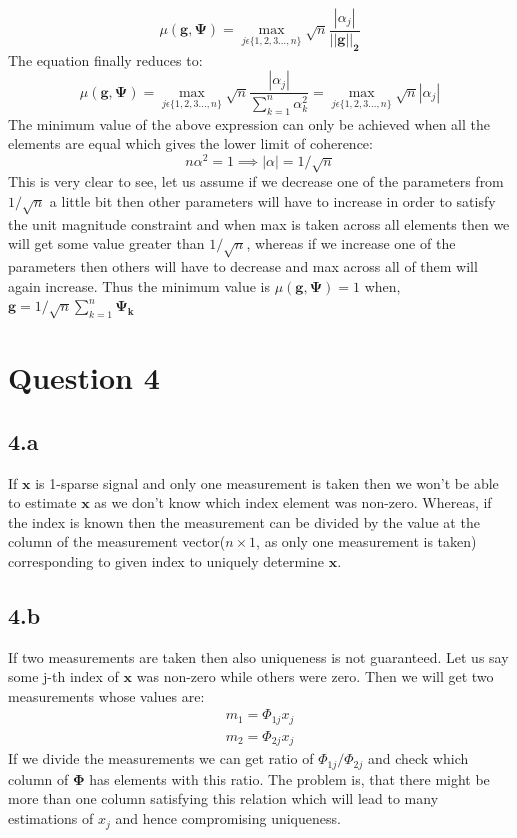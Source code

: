 \documentclass[12pt]{article}
\begin{document}
\begin{equation*}
    \mu(\boldsymbol{g}, \boldsymbol{\Psi}) =  \max_{j \epsilon \{1,2,3...,n\}}\sqrt{n}\frac{|\alpha_j|}{||\boldsymbol{g||_2}}
\end{equation*}
The equation finally reduces to:
\begin{equation*}
    \mu(\boldsymbol{g}, \boldsymbol{\Psi}) =  \max_{j \epsilon \{1,2,3...,n\}}\sqrt{n}\frac{|\alpha_j|}{\sum_{k=1}^{n}\alpha_k^2} = \max_{j \epsilon \{1,2,3...,n\}}\sqrt{n}|\alpha_j|
\end{equation*}
The minimum value of the above expression can only be achieved when all the elements are equal which gives the lower limit of coherence:
\begin{equation*}
    n\alpha^2 = 1 \implies |\alpha| = 1/\sqrt{n}
\end{equation*}
This is very clear to see, let us assume if we decrease one of the parameters from $1/\sqrt{n}$ a little bit then other parameters will have to increase in order to satisfy the unit magnitude constraint and when max is taken across all elements then we will get some value greater than $1/\sqrt{n}$, whereas if we increase one of the parameters then others will have to decrease and max across all of them will again increase. Thus the minimum value is $\mu(\boldsymbol{g}, \boldsymbol{\Psi}) = 1$ when, $\boldsymbol{g} = 1/\sqrt{n}\sum_{k=1}^{n}\boldsymbol{\Psi_k}$

\section*{Question 4}
\subsection*{4.a}
If $\boldsymbol{x}$ is 1-sparse signal and only one measurement is taken then we won't be able to estimate $\boldsymbol{x}$ as we don't know which index element was non-zero. Whereas, if the index is known then the measurement can be divided by the value at the column of the measurement vector($n\times1$, as only one measurement is taken) corresponding to given index to uniquely determine $\boldsymbol{x}$.
\subsection*{4.b}
If two measurements are taken then also uniqueness is not guaranteed. Let us say some j-th index of $\boldsymbol{x}$ was non-zero while others were zero. Then we will get two measurements whose values are:
\begin{align*}
    m_1 = \Phi_{1j}x_j\\
    m_2 = \Phi_{2j}x_j
\end{align*}
If we divide the measurements we can get ratio of $\Phi_{1j}/\Phi_{2j}$ and check which column of $\boldsymbol{\Phi}$ has elements with this ratio. The problem is, that there might be more than one column satisfying this relation which will lead to many estimations of $x_j$ and hence compromising uniqueness.
\end{document}
